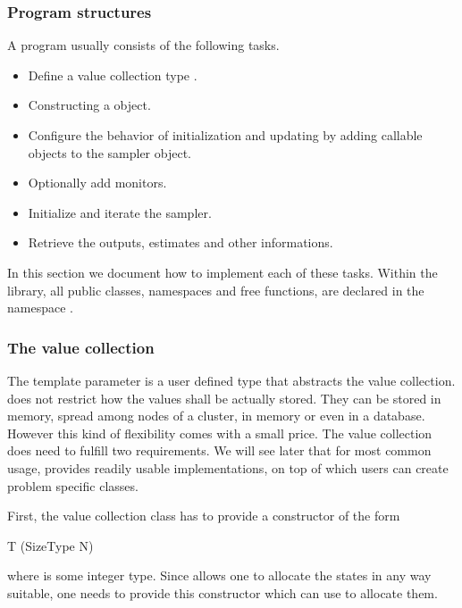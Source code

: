\subsubsection{Program structures}
\label{ssub:Program structures}

A \vsmc program usually consists of the following tasks.
\begin{itemize}
  \item Define a value collection type .
  \item Constructing a  object.
  \item Configure the behavior of initialization and updating by adding
    callable objects to the sampler object.
  \item Optionally add monitors.
  \item Initialize and iterate the sampler.
  \item Retrieve the outputs, estimates and other informations.
\end{itemize}
In this section we document how to implement each of these tasks. Within the
\vsmc library, all public classes, namespaces and free functions, are declared
in the namespace .

\subsubsection{The value collection}
\label{ssub:The value collection}

The template parameter  is a user defined type that abstracts the
value collection. \vsmc does not restrict how the values shall be actually
stored. They can be stored in memory, spread among nodes of a cluster, in \gpu
memory or even in a database. However this kind of flexibility comes with a
small price. The value collection does need to fulfill two requirements. We
will see later that for most common usage, \vsmc provides readily usable
implementations, on top of which users can create problem specific classes.

First, the value collection class  has to provide a constructor
of the form
\begin{cppcode}
T (SizeType N)
\end{cppcode}
where  is some integer type. Since \vsmc allows one to
allocate the states in any way suitable, one needs to provide this constructor
which  can use to allocate them.

